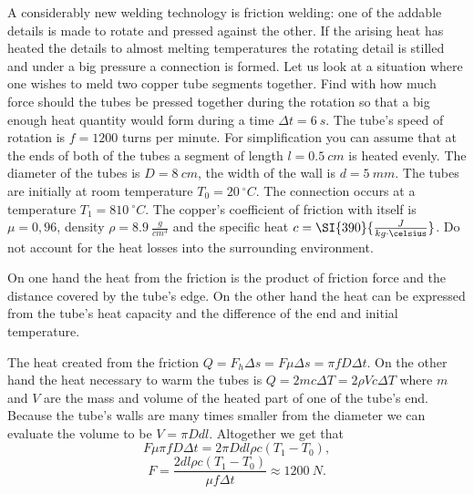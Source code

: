 {\ifEngStatement
A considerably new welding technology is friction welding: one of the addable details is made to rotate and pressed against the other. If the arising heat has heated the details to almost melting temperatures the rotating detail is stilled and under a big pressure a connection is formed. Let us look at a situation where one wishes to meld two copper tube segments together. Find with how much force should the tubes be pressed together during the rotation so that a big enough heat quantity would form during a time $\Delta t = \SI{6}{s}$. The tube’s speed of rotation is $f = 1200$ turns per minute. For simplification you can assume that at the ends of both of the tubes a segment of length $l
= \SI{0,5}{cm}$ is heated evenly. The diameter of the tubes is $D = \SI{8}{cm}$, the width of the wall is $d = \SI{5}{mm}$. The tubes are initially at room temperature $T_0 = \SI{20}{^\circ C}$. The connection occurs at a temperature $T_1 = \SI{810}{^\circ C}$. The copper’s coefficient of friction with itself is $\mu = 0,96$, density $\rho = \SI{8,9}{\frac{g}{cm^3}}$ and the specific heat $c = \SI{390}{\frac{J}{kg \cdot \celsius}}$. Do not account for the heat losses into the surrounding environment.
\fi


\ifEngHint
On one hand the heat from the friction is the product of friction force and the distance covered by the tube’s edge. On the other hand the heat can be expressed from the tube’s heat capacity and the difference of the end and initial temperature.
\fi


\ifEngSolution
The heat created from the friction $Q = F_h \Delta s = F \mu \Delta s = \pi f D \Delta t$. On the other hand the heat necessary to warm the tubes is $Q = 2 m c \Delta T = 2 \rho V c \Delta T$ where $m$ and $V$ are the mass and volume of the heated part of one of the tube’s end. Because the tube's walls are many times smaller from the diameter we can evaluate the volume to be $V = \pi D d l$. Altogether we get that
\[
F \mu \pi f D \Delta t = 2 \pi D d l \rho c ( T_1 - T_0 ),
\]
\[
F = \frac{2 d l \rho c ( T_1 - T_0 )}{ \mu f \Delta t } \approx \SI{1200}{N}.
\]
\fi
}